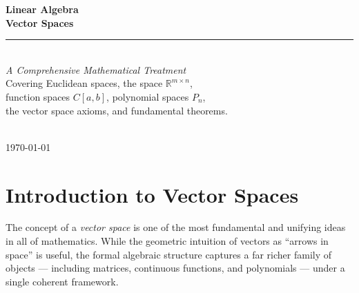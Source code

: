 \documentclass[12pt,a4paper]{article}
\newcommand{\R}{\mathbb{R}}
\begin{document}

\begin{titlepage}
  \centering
  \vspace*{3cm}
  {\Huge\bfseries\color{axiomblue} Linear Algebra}\\[0.8em]
  {\huge\bfseries Vector Spaces}\\[2em]
  \rule{0.6\linewidth}{1.5pt}\\[2em]
  {\large\itshape A Comprehensive Mathematical Treatment}\\[1em]
  {\normalsize Covering Euclidean spaces, the space $\R^{m\times n}$,\\
  function spaces $C[a,b]$, polynomial spaces $P_n$,\\
  the vector space axioms, and fundamental theorems.}\\[4em]
  \\[2em]
  \vfill
  {\small\color{notegray}\today}
\end{titlepage}

\tableofcontents
\newpage

% 
\section{Introduction to Vector Spaces}
% 
The concept of a \emph{vector space} is one of the most fundamental and unifying ideas
in all of mathematics. While the geometric intuition of vectors as ``arrows in space''
is useful, the formal algebraic structure captures a far richer family of objects
--- including matrices, continuous functions, and polynomials --- under a single
coherent framework.
\end{document}
